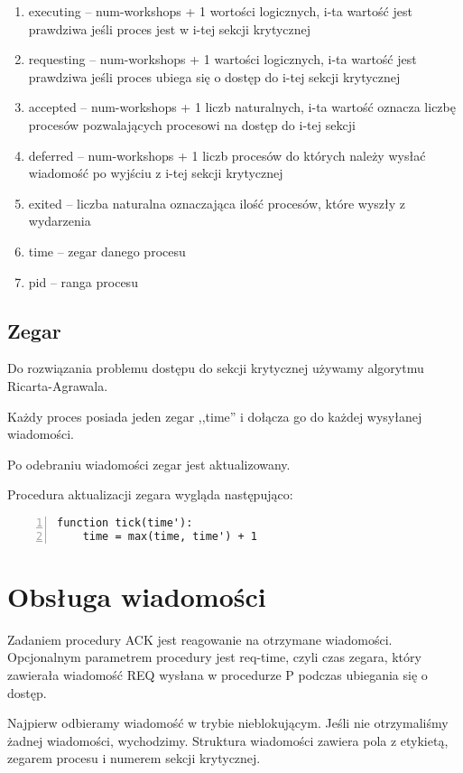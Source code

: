 \documentclass[11pt]{article}
\begin{document}
\begin{enumerate}
    \item executing -- num-workshops + 1 wortości logicznych, i-ta wartość jest prawdziwa jeśli proces jest w i-tej sekcji krytycznej
    \item requesting -- num-workshops + 1 wartości logicznych, i-ta wartość jest prawdziwa jeśli proces ubiega się o dostęp do i-tej sekcji krytycznej
    \item accepted -- num-workshops + 1 liczb naturalnych, i-ta wartość oznacza liczbę procesów pozwalających procesowi na dostęp do i-tej sekcji
    \item deferred -- num-workshops + 1 liczb procesów do których należy wysłać wiadomość po wyjściu z i-tej sekcji krytycznej
    \item exited -- liczba naturalna oznaczająca ilość procesów, które wyszły z wydarzenia
    \item time -- zegar danego procesu
    \item pid -- ranga procesu
\end{enumerate}


\subsection{Zegar}

Do rozwiązania problemu dostępu do sekcji krytycznej używamy algorytmu Ricarta-Agrawala.

Każdy proces posiada jeden zegar ,,time'' i dołącza go do każdej wysyłanej wiadomości.

Po odebraniu wiadomości zegar jest aktualizowany.

Procedura aktualizacji zegara wygląda następująco:

\begin{Verbatim}[numbers=left,xleftmargin=5mm]
function tick(time'):
    time = max(time, time') + 1
\end{Verbatim}

\section{Obsługa wiadomości}

Zadaniem procedury ACK jest reagowanie na otrzymane wiadomości.
Opcjonalnym parametrem procedury jest req-time, czyli czas zegara,
który zawierała wiadomość REQ wysłana w procedurze P podczas ubiegania się o dostęp.

Najpierw odbieramy wiadomość w trybie nieblokującym.
Jeśli nie otrzymaliśmy żadnej wiadomości, wychodzimy.
Struktura wiadomości zawiera pola z etykietą, zegarem procesu i numerem sekcji krytycznej.
\end{document}

